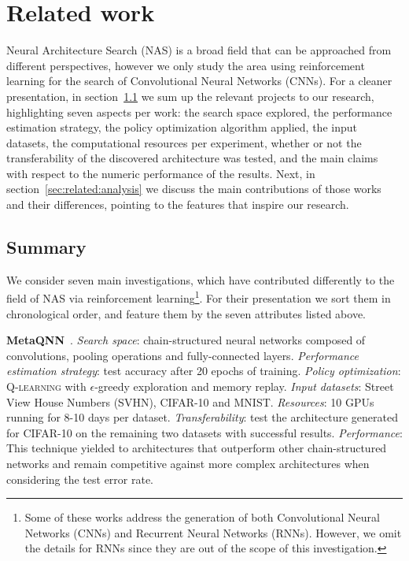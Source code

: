 \section{Related work}\label{sec:related}

Neural Architecture Search (NAS) is a broad field that can be approached from different perspectives, however we only study the area using reinforcement learning for the search of Convolutional Neural Networks (CNNs). For a cleaner presentation, in section~\ref{sec:related:summary} we sum up the relevant projects to our research, highlighting seven aspects per work: the search space explored, the performance estimation strategy, the policy optimization algorithm applied, the input datasets, the computational resources per experiment, whether or not the transferability of the discovered architecture was tested, and the main claims with respect to the numeric performance of the results. Next, in section~\ref{sec:related:analysis} we discuss the main contributions of those works and their differences, pointing to the features that inspire our research.

\subsection{Summary}\label{sec:related:summary}

We consider seven main investigations, which have contributed differently to the field of NAS via reinforcement learning\footnote{Some of these works address the generation of both Convolutional Neural Networks (CNNs) and Recurrent Neural Networks (RNNs). However, we omit the details for RNNs since they are out of the scope of this investigation.}. For their presentation we sort them in chronological order, and feature them by the seven attributes listed above.

\textbf{MetaQNN}~\citep{BakerNAS}. \emph{Search space}: chain-structured neural networks composed of convolutions, pooling operations and fully-connected layers. \emph{Performance estimation strategy}: test accuracy after 20 epochs of training. \emph{Policy optimization}: \textsc{Q-learning} with $\epsilon$-greedy exploration and memory replay. \emph{Input datasets}: Street View House Numbers (SVHN), CIFAR-10 and MNIST. \emph{Resources}: 10 GPUs running for 8-10 days per dataset. \emph{Transferability}: test the architecture generated for CIFAR-10 on the remaining two datasets with successful results. \emph{Performance}: This technique yielded to architectures that outperform other chain-structured networks and remain competitive against more complex architectures when considering the test error rate.


